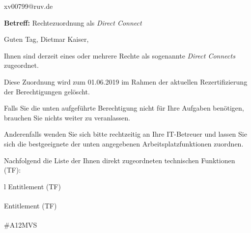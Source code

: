 \documentclass[a4paper,landscape,12pt]{letter}
\begin{document}
\begin{letter}{xv00799@ruv.de\hfill \break}
\begin{normalsize}
	\opening{\textbf{Betreff:} Rechtezuordnung als \emph{Direct Connect}}
	\begin{normalsize} \hfill
	\end{normalsize}

	\begin{normalsize}
		Guten Tag, 
	Dietmar Kaiser, \hfill \break
	\end{normalsize}
	\end{normalsize}
	
\begin{normalsize}
	Ihnen sind derzeit eines oder mehrere Rechte als sogenannte \emph{Direct Connects} zugeordnet.
	
	Diese Zuordnung wird zum 01.06.2019 im Rahmen der aktuellen Rezertifizierung der Berechtigungen gelöscht.
	
	Falls Sie die unten aufgeführte Berechtigung nicht für Ihre Aufgaben benötigen, 
	brauchen Sie nichts weiter zu veranlassen.
	
	Anderenfalls wenden Sie sich bitte rechtzeitig an Ihre IT-Betreuer 
	und lassen Sie sich die bestgeeignete der unten angegebenen Arbeitsplatzfunktionen zuordnen.
	\end{normalsize}
	
\begin{normalsize}
	Nachfolgend die Liste der Ihnen direkt zugeordneten technischen Funktionen (TF):

	\begin{longtable}{l}
		Entitlement (TF) \\ \hline
		\endfirsthead
		\\\hline
		Entitlement (TF) \\ \hline
		\endhead %
		\multicolumn{1}{r@{}}{Fortsetzung \ldots}\\
		\endfoot
		\hline
		\endlastfoot
	\#A12MVS\\
	\end{longtable}
	\end{normalsize}
	

\end{letter}
\end{document}
